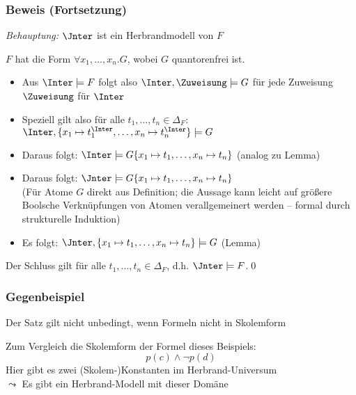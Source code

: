 \documentclass[aspectratio=1610,onlymath]{beamer}
\begin{document}
\begin{frame}\frametitle{Beweis (Fortsetzung)}

\emph{Behauptung:} \alert{$\Jnter$ ist ein Herbrandmodell von $F$}\bigskip

$F$ hat die Form $\forall x_1,\ldots, x_n.G$, wobei $G$ quantorenfrei ist.\pause
\begin{itemize}
\item Aus $\Inter\models F$ folgt also $\Inter,\Zuweisung\models G$ für jede Zuweisung $\Zuweisung$ für $\Inter$\pause
\item Speziell gilt also für alle $t_1,\ldots,t_n\in\Delta_F$: $\Inter,\{x_1\mapsto t_1^{\Inter},\ldots,x_n\mapsto t_n^{\Inter}\}\models G$\pause
\item Daraus folgt: $\Inter\models G\{x_1\mapsto t_1,\ldots,x_n\mapsto t_n\}$  (analog zu Lemma)\pause
\item Daraus folgt: $\Jnter\models G\{x_1\mapsto t_1,\ldots,x_n\mapsto t_n\}$\\
{\footnotesize(Für Atome $G$ direkt aus Definition; die Aussage kann leicht auf größere Boolsche Verknüpfungen von Atomen verallgemeinert werden -- formal durch strukturelle Induktion)}\pause
\item Es folgt: $\Jnter,\{x_1\mapsto t_1,\ldots,x_n\mapsto t_n\}\models G$ (Lemma)
\end{itemize}
Der Schluss gilt für alle $t_1,\ldots,t_n\in\Delta_F$, d.h. $\Jnter\models F$.\qed

\end{frame}

\begin{frame}\frametitle{Gegenbeispiel}

Der Satz gilt nicht unbedingt, wenn Formeln nicht in Skolemform \bigskip


Zum Vergleich die Skolemform der Formel dieses Beispiels:
\[ p(c)\wedge\neg p(d)\]
Hier gibt es zwei (Skolem-)Konstanten im Herbrand-Universum\\
$\leadsto$ Es gibt ein Herbrand-Modell mit dieser Domäne

\end{frame}
\end{document}
